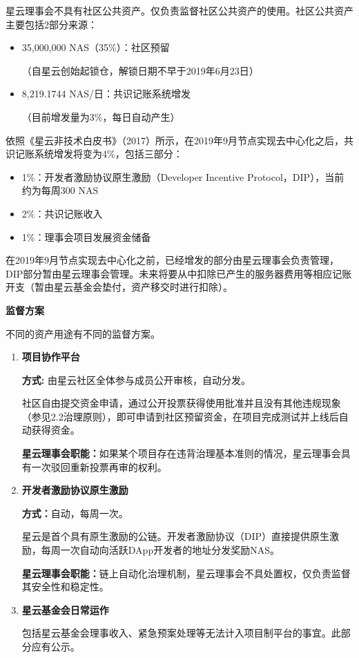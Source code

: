 星云理事会不具有社区公共资产。仅负责监督社区公共资产的使用。社区公共资产主要包括2部分来源：
\begin{itemize}
	\item 35,000,000 NAS（35\%）：社区预留

	（自星云创始起锁仓，解锁日期不早于2019年6月23日）
    \item 8,219.1744 NAS/日：共识记账系统增发
    
    （目前增发量为3\%，每日自动产生）
\end{itemize}
依照《星云非技术白皮书》（2017）所示，在2019年9月节点实现去中心化之后，共识记账系统增发将变为4\%，包括三部分：
\begin{itemize}
	\item 1\%：开发者激励协议原生激励（Developer Incentive Protocol，DIP），当前约为每周300 NAS
	\item 2\%：共识记账收入
	\item 1\%：理事会项目发展资金储备
\end{itemize}
在2019年9月节点实现去中心化之前，已经增发的部分由星云理事会负责管理，DIP部分暂由星云理事会管理。未来将要从中扣除已产生的服务器费用等相应记账开支（暂由星云基金会垫付，资产移交时进行扣除）。

\textbf{监督方案}

不同的资产用途有不同的监督方案。
\begin{enumerate}
	\item \textbf{项目协作平台}
	
	\textbf{方式:} 由星云社区全体参与成员公开审核，自动分发。
	
	社区自由提交资金申请，通过公开投票获得使用批准并且没有其他违规现象（参见2.2治理原则），即可申请到社区预留资金，在项目完成测试并上线后自动获得资金。
	
	\textbf{星云理事会职能：}如果某个项目存在违背治理基本准则的情况，星云理事会具有一次驳回重新投票再审的权利。
	
	\item \textbf{开发者激励协议原生激励}
	
	\textbf{方式：}自动，每周一次。
	
	星云是首个具有原生激励的公链。开发者激励协议（DIP）直接提供原生激励，每周一次自动向活跃DApp开发者的地址分发奖励NAS。
	
	\textbf{星云理事会职能：}链上自动化治理机制，星云理事会不具处置权，仅负责监督其安全性和稳定性。
	
	\item \textbf{星云基金会日常运作}
	
	包括星云基金会理事收入、紧急预案处理等无法计入项目制平台的事宜。此部分应有公示。
\end{enumerate}

